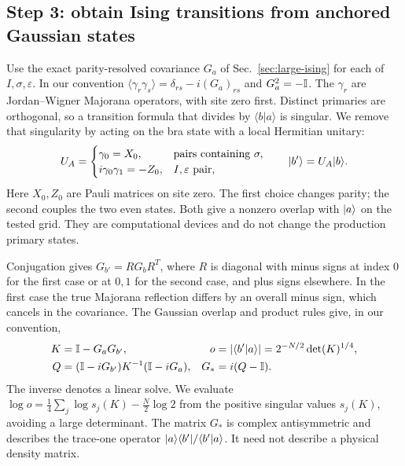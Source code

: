 \subsection{Step 3: obtain Ising transitions from anchored Gaussian states}
\label{sec:complement-ising}
Use the exact parity-resolved covariance $G_a$ of
Sec.~\ref{sec:large-ising} for each of $I,\sigma,\varepsilon$.
In our convention $\langle\gamma_r\gamma_s\rangle
=\delta_{rs}-i(G_a)_{rs}$ and $G_a^2=-\mathbb I$.
The $\gamma_r$ are Jordan--Wigner Majorana operators, with site zero
first. Distinct primaries are orthogonal, so a transition formula that
divides by $\langle b|a\rangle$ is singular. We remove that singularity
by acting on the bra state with a local Hermitian unitary:
\begin{equation}
 U_A=\begin{cases}
  \gamma_0=X_0,&\text{pairs containing }\sigma,\\
  i\gamma_0\gamma_1=-Z_0,& I,\varepsilon\text{ pair},
 \end{cases}
 \qquad \lvert b'\rangle=U_A\lvert b\rangle .
 \label{eq:complement-anchor}
\end{equation}
Here $X_0,Z_0$ are Pauli matrices on site zero.
The first choice changes parity; the second couples the two even
states. Both give a nonzero overlap with $\lvert a\rangle$ on the tested grid.
They are computational devices and do not change the production
primary states.

Conjugation gives $G_{b'}=R G_bR^T$, where $R$ is diagonal with minus
signs at index $0$ for the first case or at $0,1$ for the second case,
and plus signs elsewhere. In the first case the true Majorana
reflection differs by an overall minus sign, which cancels in the covariance.
The Gaussian overlap and product rules
\cite{Bravyi,Surace} give, in our convention,
\begin{align}
 K&=\mathbb I-G_aG_{b'},&
 o&=|\langle b'|a\rangle|
   =2^{-N/2}\det(K)^{1/4},\nonumber\\
 Q&=(\mathbb I-iG_{b'})K^{-1}(\mathbb I-iG_a),&
 G_*&=i(Q-\mathbb I).
 \label{eq:complement-transition-covariance}
\end{align}
The inverse denotes a linear solve. We evaluate
$\log o=\tfrac14\sum_j\log s_j(K)-\tfrac N2\log2$
from the positive singular values $s_j(K)$, avoiding a large determinant.
The matrix $G_*$ is complex antisymmetric and describes the trace-one
operator $\lvert a\rangle\langle b'\rvert/\langle b'|a\rangle$.
It need not describe a physical density matrix.

